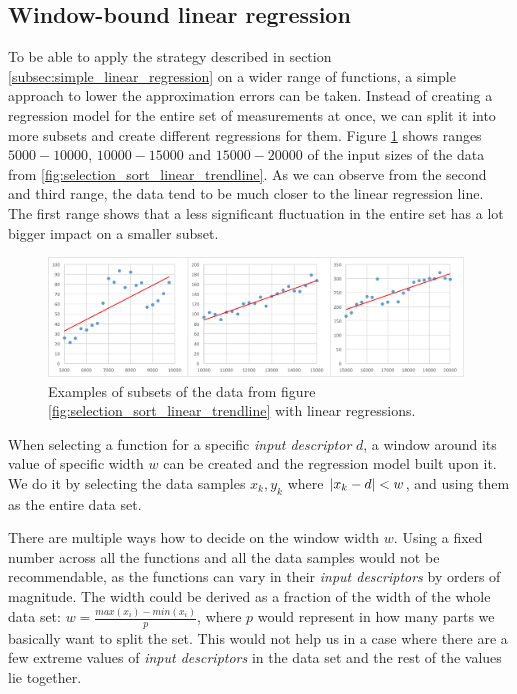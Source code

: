 \subsection{Window-bound linear regression}
\label{subsec:window_bound_regression}

To be able to apply the strategy described in section \ref{subsec:simple_linear_regression} on a wider range of functions, a simple approach to lower the approximation errors can be taken. Instead of creating a regression model for the entire set of measurements at once, we can split it into more subsets and create different regressions for them. Figure \ref{fig:window_examples} shows ranges $5000 - 10000$, $10000-15000$ and $15000-20000$ of the input sizes of the data from \ref{fig:selection_sort_linear_trendline}. As we can observe from the second and third range, the data tend to be much closer to the linear regression line. The first range shows that a less significant fluctuation in the entire set has a lot bigger impact on a smaller subset.

\begin{figure}[h!]
	\captionsetup{justification=centering,margin=0.5cm}
	\centerline{\mbox{\includegraphics[width=110mm]{./img/window_examples.png}}}
	\caption{Examples of subsets of the data from figure \ref{fig:selection_sort_linear_trendline} with linear regressions.}
	\label{fig:window_examples}
\end{figure}

When selecting a function for a specific \textit{input descriptor} $d$, a window around its value of specific width $w$ can be created and the regression model built upon it. We do it by selecting the data samples $x_k, y_k$ where $\left|{x_k - d}\right| < w$, and using them as the entire data set.

There are multiple ways how to decide on the window width $w$. Using a fixed number across all the functions and all the data samples would not be recommendable, as the functions can vary in their \textit{input descriptors} by orders of magnitude. The width could be derived as a fraction of the width of the whole data set: $w = \frac{max(x_i) - min(x_i)}{p}$, where $p$ would represent in how many parts we basically want to split the set. This would not help us in a case where there are a few extreme values of \textit{input descriptors} in the data set and the rest of the values lie together. 

